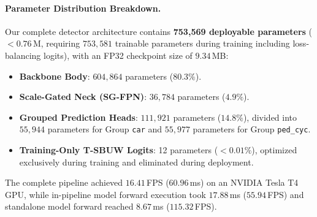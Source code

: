 \paragraph{Parameter Distribution Breakdown.}
Our complete detector architecture contains \textbf{753,569 deployable parameters} ($< 0.76$\,M, requiring $753{,}581$ trainable parameters during training including loss-balancing logits), with an FP32 checkpoint size of $9.34$\,MB:
\begin{itemize}
    \item \textbf{Backbone Body}: $604,864$ parameters ($80.3\%$).
    \item \textbf{Scale-Gated Neck (SG-FPN)}: $36,784$ parameters ($4.9\%$).
    \item \textbf{Grouped Prediction Heads}: $111,921$ parameters ($14.8\%$), divided into $55,944$ parameters for Group \texttt{car} and $55,977$ parameters for Group \texttt{ped\_cyc}.
    \item \textbf{Training-Only T-SBUW Logits}: 12 parameters ($< 0.01\%$), optimized exclusively during training and eliminated during deployment.
\end{itemize}
The complete pipeline achieved $16.41$\,FPS ($60.96$\,ms) on an NVIDIA Tesla T4 GPU, while in-pipeline model forward execution took $17.88$\,ms ($55.94$\,FPS) and standalone model forward reached $8.67$\,ms ($115.32$\,FPS).

